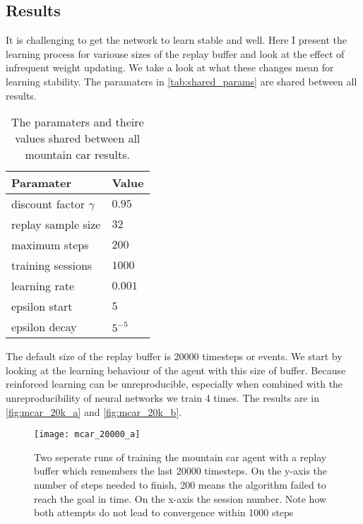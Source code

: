 \subsection{Results}

It is challenging to get the network to learn stable and well. Here I present the learning process for variouse sizes of the replay buffer and look at the effect of infrequent weight updating. We take a look at what these changes mean for learning stability. The paramaters in \autoref{tab:shared_params} are shared between all results.

\begin{table}[ht]
  \centering
  \selectfont
  \begin{tabular}{ll}
    \toprule
    Paramater & Value \\
    \midrule
    discount factor $\gamma$ & $0.95$ \\
    replay sample size & $32$ \\
    maximum steps & $200$ \\
    training sessions & $1000$ \\
    learning rate & $0.001$ \\
    epsilon start & $5$ \\
    epsilon decay & $5^{-5}$ \\
    \bottomrule
  \end{tabular}
  \caption{The paramaters and theire values shared between all mountain car results.}
  \label{tab:shared_params}
\end{table}

The default size of the replay buffer is $20000$ timesteps or events. We start by looking at the learning behaviour of the agent with this size of buffer. Because reinforced learning can be unreproducible, especially when combined with the unreproducibility of neural networks we train 4 times. The results are in \autoref{fig:mcar_20k_a} and \autoref{fig:mcar_20k_b}.

\begin{figure}
    \texttt{[image: mcar\_20000\_a]}
    \caption{Two seperate runs of training the mountain car agent with a replay buffer which remembers the last $20000$ timesteps. On the y-axis the number of steps needed to finish, 200 means the algorithm failed to reach the goal in time. On the x-axis the session number. Note how both attempts do not lead to convergence within 1000 steps}
    \label{fig:mcar_20k_a}
\end{figure}

